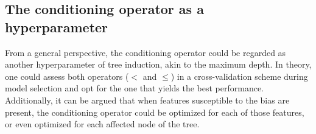 \documentclass[sn-mathphys]{sn-jnl}%
\theoremstyle{thmstyleone}%
\theoremstyle{thmstyletwo}%
\theoremstyle{thmstylethree}%
\begin{document}

\subsection{The conditioning operator as a hyperparameter}
\label{sec:hyper}

From a general perspective, the conditioning operator could be regarded as another hyperparameter of tree induction, akin to the maximum depth. In theory, one could assess both operators ($<$ and $\leq$) in a cross-validation scheme during model selection and opt for the one that yields the best performance. Additionally, it can be argued that when features susceptible to the bias are present, the conditioning operator could be optimized for each of those features, or even optimized for each affected node of the tree.
\end{document}
